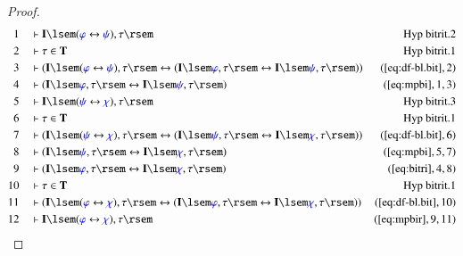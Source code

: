 \begin{proof}
\begin{align}
  1 &&  & \vdash \mathbf{I} \lsem ( \mw{\varphi} \leftrightarrow \mw{\psi} ) ,
      \tau \rsem&\text{Hyp~bitrit.2}\notag%
  \\ 2 &&  & \vdash \tau \in \mathbf{T}&\text{Hyp~bitrit.1}\notag%
  \\ 3 &&  & \vdash ( \mathbf{I} \lsem ( \mw{\varphi} \leftrightarrow \mw{\psi}
      ) , \tau \rsem \leftrightarrow ( \mathbf{I} \lsem
      \mw{\varphi} , \tau \rsem \leftrightarrow \mathbf{I}
      \lsem \mw{\psi} , \tau \rsem )
      )&(\mbox{\ref{eq:df-bl.bit}},2)\notag
  \\ 4 &&  & \vdash ( \mathbf{I} \lsem \mw{\varphi} , \tau \rsem
      \leftrightarrow \mathbf{I} \lsem \mw{\psi} , \tau
      \rsem )&(\mbox{\ref{eq:mpbi}},1,3)\notag
  \\ 5 &&  & \vdash \mathbf{I} \lsem ( \mw{\psi} \leftrightarrow \mw{\chi} ) ,
      \tau \rsem&\text{Hyp~bitrit.3}\notag%
  \\ 6 &&  & \vdash \tau \in \mathbf{T}&\text{Hyp~bitrit.1}\notag%
  \\ 7 &&  & \vdash ( \mathbf{I} \lsem ( \mw{\psi} \leftrightarrow \mw{\chi} )
      , \tau \rsem \leftrightarrow ( \mathbf{I} \lsem
      \mw{\psi} , \tau \rsem \leftrightarrow \mathbf{I}
      \lsem \mw{\chi} , \tau \rsem )
      )&(\mbox{\ref{eq:df-bl.bit}},6)\notag
  \\ 8 &&  & \vdash ( \mathbf{I} \lsem \mw{\psi} , \tau \rsem \leftrightarrow
      \mathbf{I} \lsem \mw{\chi} , \tau \rsem
      )&(\mbox{\ref{eq:mpbi}},5,7)\notag
  \\ 9 &&  & \vdash ( \mathbf{I} \lsem \mw{\varphi} , \tau \rsem
      \leftrightarrow \mathbf{I} \lsem \mw{\chi} , \tau
      \rsem )&(\mbox{\ref{eq:bitri}},4,8)\notag
  \\ 10 &&  & \vdash \tau \in \mathbf{T}&\text{Hyp~bitrit.1}\notag%
  \\ 11 &&  & \vdash ( \mathbf{I} \lsem ( \mw{\varphi} \leftrightarrow
      \mw{\chi} ) , \tau \rsem \leftrightarrow ( \mathbf{I}
      \lsem \mw{\varphi} , \tau \rsem \leftrightarrow
      \mathbf{I} \lsem \mw{\chi} , \tau \rsem )
      )&(\mbox{\ref{eq:df-bl.bit}},10)\notag
  \\ 12 &&  & \vdash \mathbf{I} \lsem ( \mw{\varphi} \leftrightarrow \mw{\chi}
      ) , \tau \rsem&(\mbox{\ref{eq:mpbir}},9,11)\notag
\end{align}
\end{proof}


